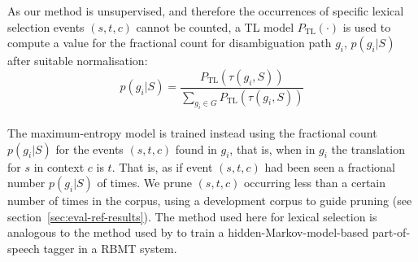 \documentclass[11pt]{article}
\newcommand{\todomlf}[1]{\renewcommand{\baselinestretch}{0.55}\todo{\scriptsize\sf MLF: #1}\renewcommand{\baselinestretch}{1.0}}
\newcommand{\comment}[1]{\todo{#1}}
\begin{document}
As our method is unsupervised, and therefore the occurrences of
specific lexical selection events \((s,t,c)\) cannot be counted, a TL
model \(P_\mathrm{TL}(\cdot)\) is used to compute a value for the
fractional count for disambiguation path \(g_i\), $p(g_i|S)$ after
suitable normalisation:%
\begin{equation}
 \label{eq:normalising}
   p(g_i|S) = \frac{P_\mathrm{TL}(\tau(g_i,S))}{\sum_{g_i \in G} P_\mathrm{TL}(\tau(g_i,S))}
\end{equation}
~\\
The maximum-entropy model is trained instead using the fractional
count $p(g_i|S)$ for the events $(s,t,c)$ found in \(g_i\), that is,
when in \(g_i\) the translation for \(s\) in context \(c\) is
$t$. That is, as if event $(s,t,c)$ had been seen a fractional number
$p(g_i|S)$ of times. We prune $(s, t, c)$ occurring less than a
certain number of times in the corpus, using a development corpus to
guide pruning (see section~\ref{sec:eval-ref-results}).
The method used here for lexical selection is analogous to the method
used by \cite{sanchez08b} to train a hidden-Markov-model-based
part-of-speech tagger in a RBMT system.
% 
\end{document}
